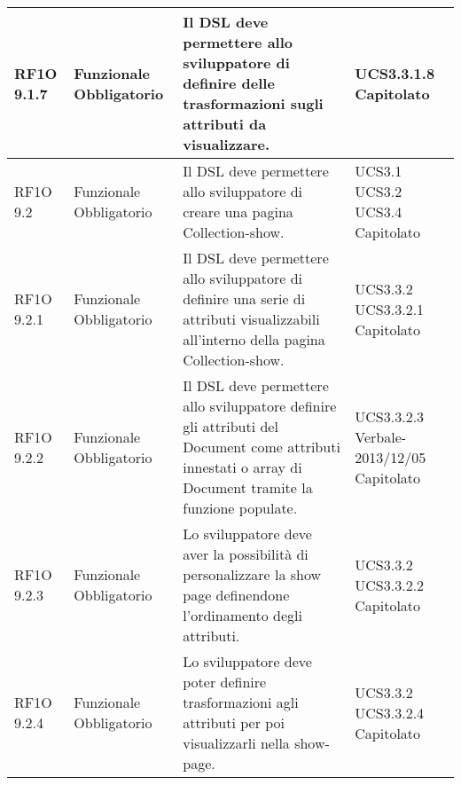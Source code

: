 \begin{center}
\begin{longtable}{ | l | p{2cm} | p{5cm} | p{1.7cm} |}
        RF1O 9.1.7 & Funzionale \newline  Obbligatorio  & Il DSL deve permettere allo sviluppatore di definire delle trasformazioni sugli attributi da visualizzare. &  UCS3.3.1.8 \newline  Capitolato \newline  \\ \hline      
        RF1O 9.2 & Funzionale \newline  Obbligatorio  & Il DSL deve permettere allo sviluppatore di creare una pagina Collection-show. &  UCS3.1 \newline  UCS3.2 \newline  UCS3.4 \newline  Capitolato \newline  \\ \hline      
        RF1O 9.2.1  & Funzionale \newline  Obbligatorio  & Il DSL deve permettere allo sviluppatore di definire una serie di attributi visualizzabili all'interno della pagina Collection-show.
 &  UCS3.3.2 \newline  UCS3.3.2.1 \newline  Capitolato \newline  \\ \hline      
        RF1O 9.2.2  & Funzionale \newline  Obbligatorio  & Il DSL deve permettere allo sviluppatore definire gli attributi del Document come attributi innestati o array di Document tramite la funzione populate.
 &  UCS3.3.2.3 \newline  Verbale-2013/12/05 \newline  Capitolato \newline  \\ \hline      
        RF1O 9.2.3 & Funzionale \newline  Obbligatorio  & Lo sviluppatore deve aver la possibilità di personalizzare la show page definendone l'ordinamento degli attributi. &  UCS3.3.2 \newline  UCS3.3.2.2 \newline  Capitolato \newline  \\ \hline      
        RF1O 9.2.4 & Funzionale \newline  Obbligatorio  & Lo sviluppatore deve poter definire trasformazioni agli attributi per poi visualizzarli nella show-page. &  UCS3.3.2 \newline  UCS3.3.2.4 \newline  Capitolato \newline  \\ \hline      

\end{longtable}
\end{center}
